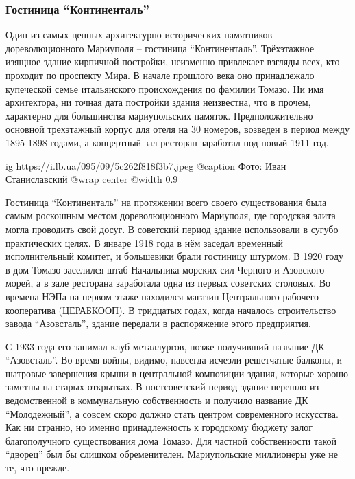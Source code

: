  
 
 
 
 

\subsubsection{Гостиница \enquote{Континенталь}}

Один из самых ценных архитектурно-исторических памятников дореволюционного
Мариуполя – гостиница \enquote{Континенталь}. Трёхэтажное изящное здание кирпичной
постройки, неизменно привлекает взгляды всех, кто проходит по проспекту Мира. В
начале прошлого века оно принадлежало купеческой семье итальянского
происхождения по фамилии Томазо. Ни имя архитектора, ни точная дата постройки
здания неизвестна, что в прочем, характерно для большинства мариупольских
памяток. Предположительно основной трехэтажный корпус для отеля на 30 номеров,
возведен в период между 1895-1898 годами, а концертный зал-ресторан заработал
под новый 1911 год.

\ifcmt
  ig https://i.lb.ua/095/09/5c262f818f3b7.jpeg
	@caption Фото: Иван Станиславский
  @wrap center
  @width 0.9
\fi

Гостиница \enquote{Континенталь} на протяжении всего своего существования была самым
роскошным местом дореволюционного Мариуполя, где городская элита могла
проводить свой досуг. В советский период здание использовали в сугубо
практических целях. В январе 1918 года в нём заседал временный исполнительный
комитет, и большевики брали гостиницу штурмом. В 1920 году в дом Томазо
заселился штаб Начальника морских сил Черного и Азовского морей, а в зале
ресторана заработала одна из первых советских столовых. Во времена НЭПа на
первом этаже находился магазин Центрального рабочего кооператива (ЦЕРАБКООП). В
тридцатых годах, когда началось строительство завода \enquote{Азовсталь}, здание
передали в распоряжение этого предприятия.

С 1933 года его занимал клуб металлургов, позже получивший название ДК
\enquote{Азовсталь}. Во время войны, видимо, навсегда исчезли решетчатые балконы, и
шатровые завершения крыши в центральной композиции здания, которые хорошо
заметны на старых открытках. В постсоветский период здание перешло из
ведомственной в коммунальную собственность и получило название ДК \enquote{Молодежный},
а совсем скоро должно стать центром современного искусства. Как ни странно, но
именно принадлежность к городскому бюджету залог благополучного существования
дома Томазо. Для частной собственности такой \enquote{дворец} был бы слишком
обременителен. Мариупольские миллионеры уже не те, что прежде.
